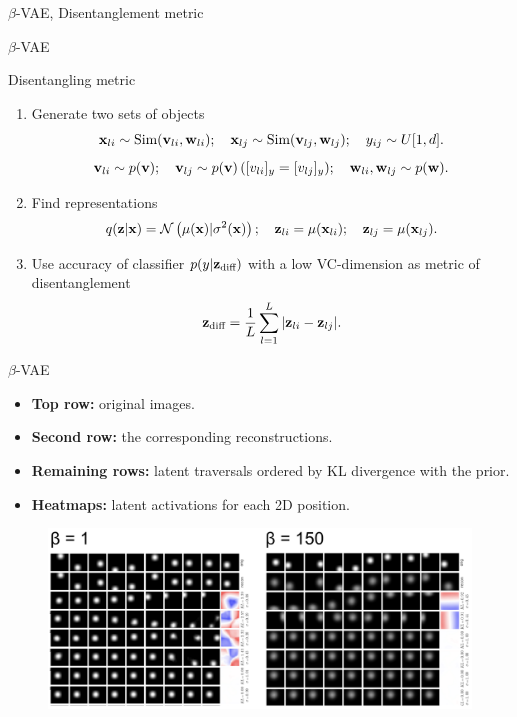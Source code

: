 \begin{frame}{$\beta$-VAE, Disentanglement metric}
\end{frame}
\begin{frame}{$\beta$-VAE}
	\begin{block}{Disentangling metric}
		\begin{enumerate}
			\item Generate two sets of objects
			\[
			\mathbf{x}_{li} \sim \text{Sim}(\mathbf{v}_{li}, \mathbf{w}_{li}); \quad \mathbf{x}_{lj} \sim \text{Sim}(\mathbf{v}_{lj}, \mathbf{w}_{lj}); \quad y_{ij} \sim U[1, d].
			\]
			\[
			\mathbf{v}_{li} \sim p(\mathbf{v}); \quad \mathbf{v}_{lj} \sim p(\mathbf{v}) \, ([v_{li}]_y = [v_{lj}]_y); \quad \mathbf{w}_{li}, \mathbf{w}_{lj} \sim p(\mathbf{w}).
			\]
			\item Find representations
			\[
			q(\mathbf{z} | \mathbf{x}) = \mathcal{N}\left(\mu(\mathbf{x}) | \sigma^2(\mathbf{x})\right); \quad \mathbf{z}_{li} = \mu(\mathbf{x}_{li}); \quad \mathbf{z}_{lj} = \mu(\mathbf{x}_{lj}).
			\]
			\item Use accuracy of classifier $p(y | \mathbf{z}_{\text{diff}})$ with a low VC-dimension as metric of disentanglement
			\[
			\mathbf{z}_{\text{diff}} = \frac{1}{L} \sum_{l=1}^L | \mathbf{z}_{li} - \mathbf{z}_{lj} |.
			\]
		\end{enumerate}
	\end{block}

\end{frame}
\begin{frame}{$\beta$-VAE}
	\begin{itemize}
		\item \textbf{Top row:} original images.
		\item \textbf{Second row:} the corresponding reconstructions. 
		\item \textbf{Remaining rows:} latent traversals ordered by KL divergence with the prior. 
		\item \textbf{Heatmaps:} latent activations for each 2D position.
	\end{itemize}
	\begin{figure}
		\centering
		\includegraphics[width=\linewidth]{figs/betaVAE_6.png}
	\end{figure}

\end{frame}
